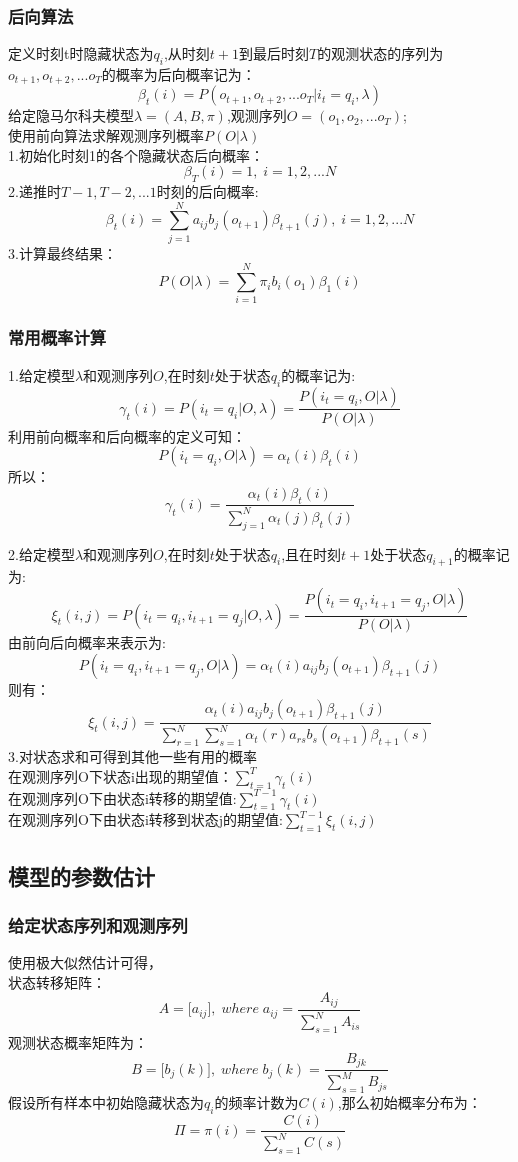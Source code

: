 \documentclass[UTF8]{article}%
\begin{document}
	\subsubsection{后向算法}
	定义时刻t时隐藏状态为$q_i$,从时刻$t+1$到最后时刻$T$的观测状态的序列为$o_{t+1},o_{t+2},...o_T$的概率为后向概率记为：$$\beta_t(i) = P(o_{t+1},o_{t+2},...o_T| i_t =q_i , \lambda)$$
	给定隐马尔科夫模型$\lambda = (A,B,\pi)$,观测序列$O=(o_1,o_2,...o_T)$;
	\\使用前向算法求解观测序列概率$P(O|\lambda)$
	\\1.初始化时刻1的各个隐藏状态后向概率：$$\beta_T(i) = 1,\; i=1,2,...N$$
	2.递推时$T-1,T-2,...1$时刻的后向概率:$$\beta_{t}(i) = \sum\limits_{j=1}^{N}a_{ij}b_j(o_{t+1})\beta_{t+1}(j),\; i=1,2,...N$$
	3.计算最终结果：$$P(O|\lambda) = \sum\limits_{i=1}^N\pi_ib_i(o_1)\beta_1(i)$$
	
	\subsubsection{常用概率计算}
	1.给定模型$\lambda$和观测序列$O$,在时刻$t$处于状态$q_i$的概率记为:
	$$\gamma_t(i) = P(i_t = q_i | O,\lambda) = \frac{P(i_t = q_i ,O|\lambda)}{P(O|\lambda)}$$
	利用前向概率和后向概率的定义可知：$$P(i_t = q_i ,O|\lambda) = \alpha_t(i)\beta_t(i)$$
	所以：$$\gamma_t(i) = \frac{ \alpha_t(i)\beta_t(i)}{\sum\limits_{j=1}^N \alpha_t(j)\beta_t(j)}$$
	
	2.给定模型$\lambda$和观测序列$O$,在时刻$t$处于状态$q_i$,且在时刻$t+1$处于状态$q_{i+1}$的概率记为:$$\xi_t(i,j) = P(i_t = q_i, i_{t+1}=q_j | O,\lambda) = \frac{ P(i_t = q_i, i_{t+1}=q_j , O|\lambda)}{P(O|\lambda)}$$
	由前向后向概率来表示为:$$P(i_t = q_i, i_{t+1}=q_j , O|\lambda) = \alpha_t(i)a_{ij}b_j(o_{t+1})\beta_{t+1}(j)$$
	则有：$$\xi_t(i,j) = \frac{\alpha_t(i)a_{ij}b_j(o_{t+1})\beta_{t+1}(j)}{\sum\limits_{r=1}^N\sum\limits_{s=1}^N\alpha_t(r)a_{rs}b_s(o_{t+1})\beta_{t+1}(s)}$$
	3.对状态求和可得到其他一些有用的概率
	\\在观测序列O下状态i出现的期望值：$\sum\limits_{t=1}^T\gamma_t(i)$
	\\在观测序列O下由状态i转移的期望值:$\sum\limits_{t=1}^{T-1}\gamma_t(i)$
	\\在观测序列O下由状态i转移到状态j的期望值:$\sum\limits_{t=1}^{T-1}\xi_t(i,j)$
	
	\subsection{模型的参数估计}
	\subsubsection{给定状态序列和观测序列}
	使用极大似然估计可得，
	\\状态转移矩阵：$$A = \Big[a_{ij}\Big], \;where\; a_{ij} = \frac{A_{ij}}{\sum\limits_{s=1}^{N}A_{is}}$$
	观测状态概率矩阵为：$$B= \Big[b_{j}(k)\Big], \;{where}\; b_{j}(k) = \frac{B_{jk}}{\sum\limits_{s=1}^{M}B_{js}}$$
	假设所有样本中初始隐藏状态为$q_i$的频率计数为$C(i)$,那么初始概率分布为：
	$$\Pi = \pi(i) = \frac{C(i)}{\sum\limits_{s=1}^{N}C(s)}$$
	\newpage
\end{document}
